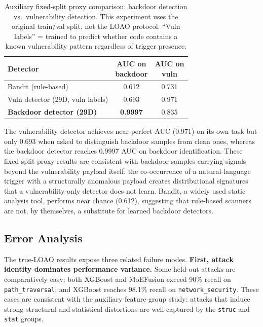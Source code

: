 ﻿\documentclass[sigconf,review,anonymous]{acmart}
\newcommand{\sys}{MoEFusion}
\begin{document}
\begin{table}[t]
\centering
\caption{Auxiliary fixed-split proxy comparison: backdoor detection vs.\ vulnerability
detection. This experiment uses the original train/val split, not the LOAO
protocol. ``Vuln labels'' = trained to predict whether code contains a known
vulnerability pattern regardless of trigger presence.}
\label{tab:bdvuln}
\small
\begin{tabular}{lcc}
\toprule
Detector & \makecell{AUC on\\backdoor} & \makecell{AUC on\\vuln} \\
\midrule
Bandit (rule-based) & 0.612 & 0.731 \\
Vuln detector (29D, vuln labels) & 0.693 & 0.971 \\
\textbf{Backdoor detector (29D)} & \textbf{0.9997} & 0.835 \\
\bottomrule
\end{tabular}
\end{table}

The vulnerability detector achieves near-perfect AUC (0.971) on its own task
but only 0.693 when asked to distinguish backdoor samples from clean ones,
whereas the backdoor detector reaches 0.9997 AUC on backdoor identification.
These fixed-split proxy results are consistent with backdoor samples carrying
signals beyond the vulnerability payload itself: the co-occurrence of a
natural-language trigger with a structurally anomalous payload creates
distributional signatures that a vulnerability-only detector does not learn.
Bandit, a widely used static analysis tool, performs near chance (0.612),
suggesting that rule-based scanners are not, by themselves, a substitute for
learned backdoor detectors.

\subsection{Error Analysis}
\label{sec:exp:error}

The true-LOAO results expose three related failure modes.
\textbf{First, attack identity dominates performance variance.}
Some held-out attacks are comparatively easy: both XGBoost and \sys{} exceed
90\% recall on \texttt{path\_traversal}, and XGBoost reaches 98.1\% recall on
\texttt{network\_security}.
These cases are consistent with the auxiliary feature-group study: attacks that induce
strong structural and statistical distortions are well captured by the
\texttt{struc} and \texttt{stat} groups.
\end{document}
